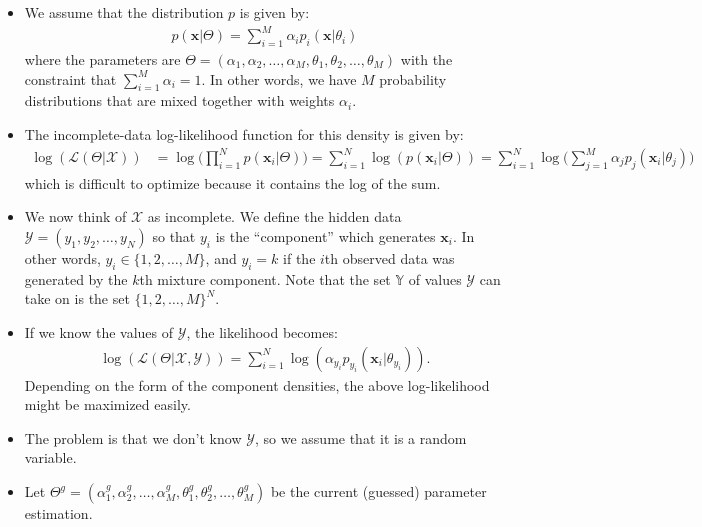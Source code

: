 \documentclass[10pt]{article}
\newcommand{\likelihood}{\mathcal{L}}
\newcommand{\X}{\mathcal{X}}
\newcommand{\Y}{\mathcal{Y}}
\newcommand{\x}{\mathbf{x}}
\begin{document}
  \begin{itemize}
    \item We assume that the distribution $p$ is given by:
    \begin{align*}
      p(\x|\Theta) = \sum_{i=1}^M \alpha_i p_i(\x|\theta_i)
    \end{align*}
    where the parameters are $\Theta = (\alpha_1, \alpha_2, \dotsc, \alpha_M, \theta_1, \theta_2, \dotsc, \theta_M)$ with the constraint that $\sum_{i=1}^M \alpha_i = 1$. In other words, we have $M$ probability distributions that are mixed together with weights $\alpha_i$.
    
    \item The incomplete-data log-likelihood function for this density is given by:
    \begin{align*}
      \log(\likelihood(\Theta|\X))
      &= \log\bigg( \prod_{i=1}^N p(\x_i|\Theta) \bigg)
      = \sum_{i=1}^N \log(p(\x_i|\Theta))
      = \sum_{i=1}^N \log\bigg( \sum_{j=1}^M \alpha_j p_j(\x_i|\theta_j) \bigg)
    \end{align*}
    which is difficult to optimize because it contains the log of the sum.
    
    \item We now think of $\X$ as incomplete. We define the hidden data $\Y = (y_1, y_2, \dotsc, y_N)$ so that $y_i$ is the ``component'' which generates $\x_i$. In other words, $y_i \in \{ 1, 2, \dotsc, M \}$, and $y_i = k$ if the $i$th observed data was generated by the $k$th mixture component. Note that the set $\mathbb{Y}$ of values $\Y$ can take on is the set $\{1, 2, \dotsc, M\}^N$. 
    
    \item If we know the values of $\Y$, the likelihood becomes:
    \begin{align*}
      \log(\likelihood(\Theta|\X,\Y)) = \sum_{i=1}^N \log(\alpha_{y_i} p_{y_i}(\x_i|\theta_{y_i})).
    \end{align*}
    Depending on the form of the component densities, the above log-likelihood might be maximized easily.
    
    \item The problem is that we don't know $\Y$, so we assume that it is a random variable.
    
    \item Let $\Theta^g = (\alpha_1^g, \alpha_2^g, \dotsc, \alpha_M^g, \theta_1^g, \theta_2^g, \dotsc, \theta_M^g)$ be the current (guessed) parameter estimation. 
    

\end{itemize}
\end{document}
